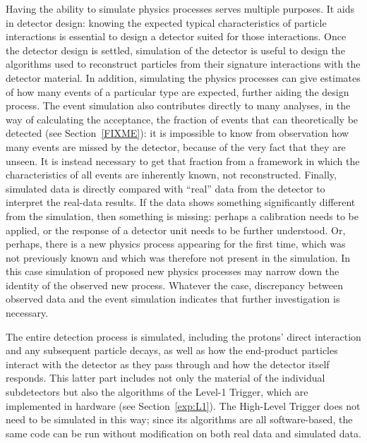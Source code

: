 Having the ability to simulate physics processes 
serves multiple purposes. 
It aids in detector design: 
knowing the expected typical characteristics of particle 
interactions is essential to design a detector 
suited for those interactions.  
Once the detector design is settled, 
simulation of the detector is useful to design 
the algorithms used to reconstruct particles 
from their signature interactions with the 
detector material.  
In addition, simulating the physics processes 
can give estimates of how many 
events of a particular type are expected, 
further aiding the design process.  
The event simulation also contributes 
directly to many analyses, 
in the way of calculating the acceptance, 
the fraction of events that can theoretically 
be detected (see Section~\ref{FIXME}): 
it is impossible to know from observation 
how many events are missed by the detector, 
because of the very fact that they are unseen.  
It is instead necessary to get that fraction 
from a framework in which 
the characteristics of all events are 
inherently known, not reconstructed.  
Finally, %
simulated data is directly compared 
with ``real'' data from the detector 
to interpret the real-data results.  
If the data shows something significantly 
different from the simulation, 
then something is missing: 
perhaps a calibration needs to be applied, 
or the response of a detector unit needs 
to be further understood.  
Or, perhaps, there is a new physics process 
appearing for the first time, 
which was not previously known and 
which was therefore not present in the simulation.  
In this case simulation of proposed new physics 
processes may narrow down the identity of the 
observed new process.  
Whatever the case, 
discrepancy between observed data and the event 
simulation indicates that further 
investigation is necessary.  







The entire detection process is simulated, 
including the protons' direct interaction 
and any subsequent particle decays, 
as well as how the end-product particles 
interact with the detector as they pass through 
and how the detector itself responds.  
This latter part includes not only the 
material of the individual subdetectors 
but also the algorithms of 
the Level-1 Trigger, 
which are implemented in hardware 
(see Section~\ref{exp:L1}).  
The High-Level Trigger does not need to be 
simulated in this way; 
since its algorithms are all software-based, 
the same code can be run without modification 
on both real data and simulated data.  



